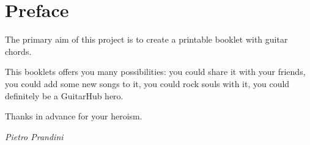 \section*{Preface}
The primary aim of this project is to create a printable booklet with guitar chords.\par
This booklets offers you many possibilities: you could share it with your friends, you could add some new songs to it,
you could rock souls with it, you could definitely be a GuitarHub hero.\par
Thanks in advance for your heroism.\par
\begin{flushright}
	{\textit{\rmfamily Pietro Prandini}}\par
\end{flushright}
\newpage
